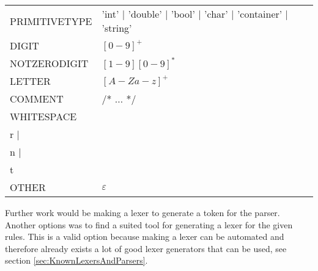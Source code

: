 \begin{tabular}{l l}
PRIMITIVETYPE & 'int' | 'double' | 'bool' | 'char' | 'container' | 'string' \\
DIGIT & $[0 - 9]^+$ \\
NOTZERODIGIT & $[1-9][0-9]^*$ \\
LETTER & $[A-Za-z]^+$\\
COMMENT & /* $\dots$ */ \\
WHITESPACE & \\r | \\n | \\t \\
OTHER & $\varepsilon$ \\
\end{tabular}

Further work would be making a lexer to generate a token for the parser. Another options was to find a suited tool for generating a lexer for the given rules. This is a valid option because making a lexer can be automated and therefore already exists a lot of good lexer generators that can be used, see section \ref{sec:KnownLexersAndParsers}.